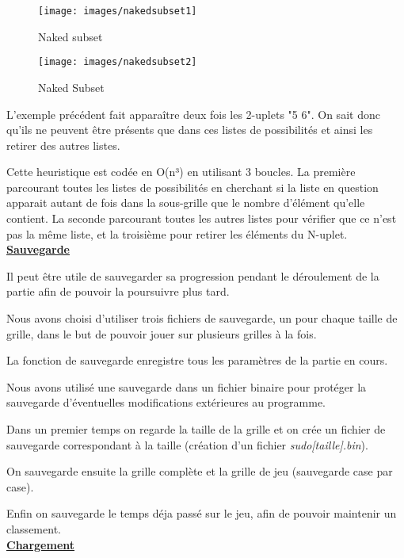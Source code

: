 \documentclass[a4paper, 12pt]{article}
\begin{document}
	\begin{figure}[H]
		\caption{Naked subset}
		\centering
		\texttt{[image: images/nakedsubset1]}
	\end{figure}

	\begin{figure}[H]
		\caption{Naked Subset}
		\centering
		\texttt{[image: images/nakedsubset2]}
	\end{figure}

	\par L'exemple précédent fait apparaître deux fois les 2-uplets "5 6". On sait donc qu'ils ne peuvent être présents que dans ces listes de possibilités et ainsi les retirer des autres listes.
	\par Cette heuristique est codée en O(n³) en utilisant 3 boucles. La première parcourant toutes les listes de possibilités en cherchant si la liste en question apparait autant de fois dans la sous-grille que le nombre d'élément qu'elle contient. La seconde parcourant toutes les autres listes pour vérifier que ce n'est pas la même liste, et la troisième pour retirer les éléments du N-uplet.\\
 
\underline{\textbf{Sauvegarde}}

	\par Il peut être utile de sauvegarder sa progression pendant le déroulement de la partie afin de pouvoir la poursuivre plus tard.
	\par Nous avons choisi d'utiliser trois fichiers de sauvegarde, un pour chaque taille de grille, dans le but de pouvoir jouer sur plusieurs grilles à la fois.
	\par La fonction de sauvegarde enregistre tous les paramètres de la partie en cours.
	\par Nous avons utilisé une sauvegarde dans un fichier binaire pour protéger la sauvegarde d'éventuelles modifications extérieures au programme.
	\par Dans un premier temps on regarde la taille de la grille et on crée un fichier de sauvegarde correspondant à la taille (création d'un fichier \textit{sudo[taille].bin}).
	\par On sauvegarde ensuite la grille complète et la grille de jeu (sauvegarde case par case).
	\par Enfin on sauvegarde le temps déja passé sur le jeu, afin de pouvoir maintenir un classement.\\

\underline{\textbf{Chargement}}
\end{document}
